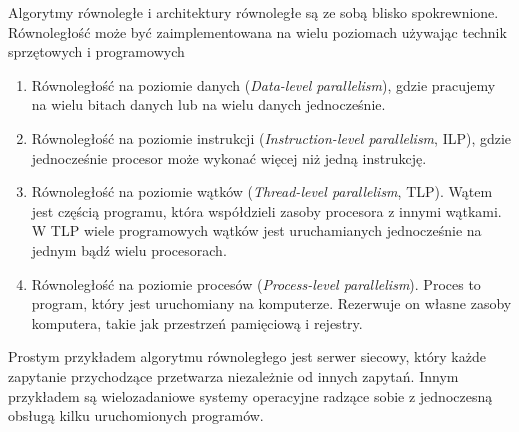 Algorytmy równoległe i architektury równoległe są ze sobą blisko spokrewnione. Równoległość może być zaimplementowana na wielu poziomach używając technik sprzętowych i programowych
\begin{enumerate}
\item{Równoległość na poziomie danych (\emph{Data-level parallelism}), gdzie pracujemy na wielu bitach danych lub na wielu danych jednocześnie.}
\item{Równoległość na poziomie instrukcji (\emph{Instruction-level parallelism}, ILP), gdzie jednocześnie procesor może wykonać więcej niż jedną instrukcję.}
\item{Równoległość na poziomie wątków (\emph{Thread-level parallelism}, TLP). Wątem jest częścią programu, która współdzieli zasoby procesora z innymi wątkami. W TLP wiele programowych wątków jest uruchamianych jednocześnie na jednym bądź wielu procesorach.}
\item{Równoległość na poziomie procesów (\emph{Process-level parallelism}). Proces to program, który jest uruchomiany na komputerze. Rezerwuje on własne zasoby komputera, takie jak przestrzeń pamięciową i rejestry.}
\end{enumerate}\cite{APC2011}

\begin{przyklad}
Prostym przykładem algorytmu równoległego jest serwer siecowy, który każde zapytanie przychodzące przetwarza niezależnie od innych zapytań. Innym przykładem są wielozadaniowe systemy operacyjne radzące sobie z jednoczesną obsługą kilku uruchomionych programów.
\end{przyklad}

%
%
%
%
